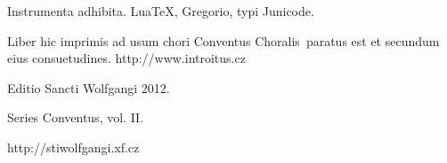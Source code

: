 \documentclass[a4paper, twoside, 12pt]{article}
\begin{document}
Instrumenta adhibita.
LuaTeX, %
Gregorio, %
typi Junicode. %

\begin{center}
Liber hic imprimis ad usum chori 
\guillemotright Conventus Choralis\guillemotleft\ 
paratus est
et secundum eius consuetudines.
http://www.introitus.cz

\vspace{1cm}

{\large Editio Sancti Wolfgangi 2012.}

\vspace{2mm}

Series \guillemotright Conventus\guillemotleft, vol. II.

\vspace{1cm}

http://stiwolfgangi.xf.cz

\end{center}

\vfill
\end{document}
